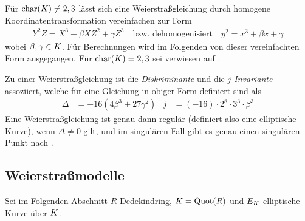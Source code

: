 \documentclass[german, bibliography=totoc]{scrreprt}
\begin{document}
Für $\operatorname{char}(K)\neq 2,3$ lässt sich eine Weierstraßgleichung durch
homogene Koordinatentransformation vereinfachen zur Form
\begin{gather*}
  Y^2 Z = X^3 + \beta XZ^2 + \gamma Z^3
  \quad\text{bzw. dehomogenisiert}\quad
  y^2 = x^3 + \beta x + \gamma
\end{gather*}
wobei $\beta,\gamma\in K$.
Für Berechnungen wird im Folgenden von dieser vereinfachten Form
ausgegangen. Für $\operatorname{char}(K)=2,3$ sei verwiesen auf
\cite[Appendix: Elliptic Curves in Characteristics 2 and 3]{silverman}.


Zu einer Weierstraßgleichung ist die \emph{Diskriminante} und die
\emph{$j$-Invariante} assoziiert, welche für eine Gleichung in obiger
Form definiert sind als 
\begin{align*}
  \Delta &= -16\left(4\beta^3 + 27\gamma^2\right)
  &j &= (-16)\cdot 2^8\cdot 3^3\cdot\beta^3
\end{align*}
Eine Weierstraßgleichung ist genau dann regulär (definiert also eine
elliptische Kurve), wenn $\Delta\neq 0$ gilt,
und im singulären Fall gibt es genau einen singulären Punkt
nach \cite[Proposition III.1.4]{silverman}.


\subsection{Weierstraßmodelle}
Sei im Folgenden Abschnitt $R$ Dedekindring,
$K=\operatorname{Quot}(R)$ und $E_{K}$ elliptische Kurve über $K$.
\end{document}
